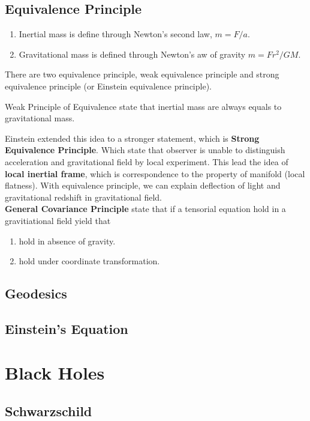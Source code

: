 \documentclass[12pt]{article}
\theoremstyle{mystyle}{\newtheorem{definition}{Definition}[section]}
\theoremstyle{mystyle}{\newtheorem{theorem}[definition]{Theorem}}
\theoremstyle{mystyle}{\newtheorem*{remark}{Remark}}
\theoremstyle{mystyle}{\newtheorem*{example}{Example}}
\theoremstyle{mystyle}{\newtheorem*{examples}{Examples}}
\theoremstyle{cstyle}{\newtheorem*{cthm}{}}
\begin{document}
\subsection{Equivalence Principle}
\begin{definition}
  \begin{enumerate}
    \item Inertial mass is define through Newton's second law, \(m = F/a\).
    \item Gravitational mass is defined through Newton's aw of gravity \(m = Fr^2/GM\).
  \end{enumerate}
\end{definition}
There are two equivalence principle, weak equivalence principle and strong equivalence principle
(or Einstein equivalence principle).
\begin{definition}
  Weak Principle of Equivalence state that inertial mass are always equals to gravitational mass.
\end{definition}
Einstein extended this idea to a stronger statement, which is \textbf{Strong Equivalence Principle}.
Which state that observer is unable to distinguish acceleration and gravitational field by local experiment.
This lead the idea of \textbf{local inertial frame}, which is correspondence to the property of manifold (local flatness).
With equivalence principle, we can explain deflection of light and gravitational redshift in gravitational field.\\
\textbf{General Covariance Principle} state that if a tensorial equation hold in a gravitiational field yield that
\begin{enumerate}
  \item hold in absence of gravity.
  \item hold under coordinate transformation.
\end{enumerate}
\subsection{Geodesics}
\subsection{Einstein's Equation}

\section{Black Holes}
\subsection{Schwarzschild}
\end{document}
